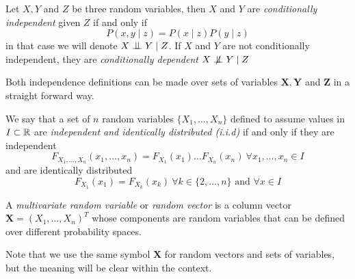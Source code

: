 \begin{definition}
Let \(X,Y\) and \(Z\) be three random variables, then \(X\) and \(Y\) are
\emph{conditionally independent} given \(Z\) if and only if
\[
P(x,y \mid  z) = P(x\mid z)P(y\mid z)
\]
in that case we will denote \(X \bigCI Y \mid Z\). If \(X\) and \(Y\) are not
conditionally independent, they are \emph{conditionally dependent} \(X \bigCD Y \mid Z\)

\end{definition}

Both independence definitions can be made over sets of variables \(\bm{X},
\bm{Y}\) and \(\bm{Z}\) in a straight forward way.


\begin{definition}
  We say that a set of \(n\) random variables \(\{X_1,\dots,X_n\}\) defined to
  assume values in \(I \subset \mathbb{R}\) are
  \emph{independent and identically distributed (i.i.d)}
  if and only if they are independent
  \[
    F_{X_1,\dots,X_n}(x_1,\dots,x_n) = F_{X_1}(x_1)\dots F_{X_n}(x_n) \ \forall
    x_1,\dots,x_n \in I
  \]
  and are identically distributed
  \[
    F_{X_1}(x_1) = F_{X_k}(x_k) \ \forall k \in \{2,\dots,n\} \text{ and } \forall x
    \in I
  \]


\end{definition}


\begin{definition}
  A \emph{multivariate random variable} or \emph{random vector} is a column vector \(\bm{X} =
  (X_1,\dots,X_n)^T\) whose components are random variables that can be defined
  over different probability spaces.

  Note that we use the same symbol \(\bm{X}\) for random vectors and sets of
  variables, but the meaning will be clear within the context.
\end{definition}

